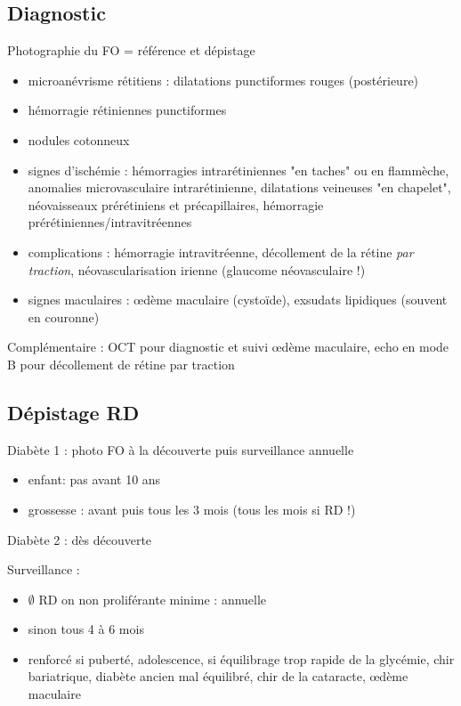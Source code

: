 \documentclass[11pt]{article}
\begin{document}
\subsection{Diagnostic}
\label{sec:org4061a34}
Photographie du FO = référence et dépistage
\begin{itemize}
\item microanévrisme rétitiens : dilatations punctiformes rouges (postérieure)
\item hémorragie rétiniennes punctiformes
\item nodules cotonneux
\item signes d'ischémie : hémorragies intrarétiniennes "en taches" ou en flammèche, anomalies
microvasculaire intrarétinienne, dilatations veineuses "en chapelet",
néovaisseaux prérétiniens et précapillaires, hémorragie prérétiniennes/intravitréennes
\item complications : hémorragie intravitréenne, décollement de la rétine \emph{par
traction}, néovascularisation irienne (\thus glaucome néovasculaire !)
\item signes maculaires : \oe{}dème maculaire (cystoïde), exsudats lipidiques
(souvent en couronne)
\end{itemize}

Complémentaire : OCT pour diagnostic et suivi \oe{}dème maculaire, echo en mode B
pour décollement de rétine par traction

\subsection{Dépistage RD}
\label{sec:org9524e43}
Diabète 1 : photo FO à la découverte puis surveillance annuelle
\begin{itemize}
\item enfant: pas avant 10 ans
\item grossesse : avant puis tous les 3 mois (tous les mois si RD !)
\end{itemize}
Diabète 2 : dès découverte

Surveillance :
\begin{itemize}
\item \(\emptyset\) RD on non proliférante minime : annuelle
\item sinon tous 4 à 6 mois
\item renforcé si puberté, adolescence, si équilibrage trop rapide de la glycémie,
chir bariatrique, diabète ancien mal équilibré, chir de la cataracte,
\oe{}dème maculaire
\end{itemize}
\end{document}
